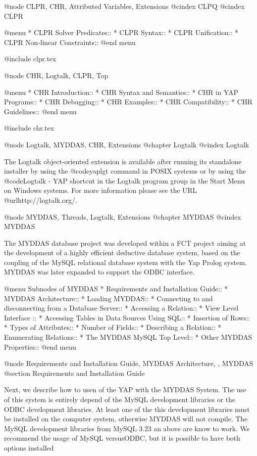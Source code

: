 {{{{{{{{{@node CLPR, CHR, Attributed Variables, Extensions
@cindex CLPQ
@cindex CLPR

@menu
* CLPR Solver Predicates::
* CLPR Syntax::
* CLPR Unification::
* CLPR Non-linear Constraints::               
@end menu

@include clpr.tex

@node CHR, Logtalk, CLPR, Top

@menu
* CHR Introduction::            
* CHR Syntax and Semantics::
* CHR in YAP Programs::
* CHR Debugging::               
* CHR Examples::       
* CHR Compatibility::     
* CHR Guidelines::  
@end menu

@include chr.tex

@node Logtalk, MYDDAS, CHR, Extensions
@chapter Logtalk
@cindex Logtalk

The Logtalk object-oriented extension is available after running its 
standalone installer by using the @code{yaplgt} command in POSIX 
systems or by using the @code{Logtalk - YAP} shortcut in the Logtalk 
program group in the Start Menu on Windows systems. For more information 
please see the URL @url{http://logtalk.org/}.

@node MYDDAS, Threads, Logtalk, Extensions
@chapter MYDDAS
@cindex MYDDAS

The MYDDAS database project was developed within a FCT project aiming at
the development of a highly efficient deductive database system, based
on the coupling of the MySQL relational database system with the Yap
Prolog system. MYDDAS was later expanded to support the ODBC interface.

@menu
Subnodes of MYDDAS
* Requirements and Installation Guide:: 
* MYDDAS Architecture:: 
* Loading MYDDAS:: 
* Connecting to and disconnecting from a Database Server:: 
* Accessing a Relation:: 
* View Level Interface :: 
* Accessing Tables in Data Sources Using SQL:: 
* Insertion of Rows:: 
* Types of Attributes:: 
* Number of Fields:: 
* Describing a Relation:: 
* Enumerating Relations:: 
* The MYDDAS MySQL Top Level:: 
* Other MYDDAS Properties:: 
@end menu

@node Requirements and Installation Guide, MYDDAS Architecture, , MYDDAS
@section Requirements and Installation Guide

Next, we describe how to usen of the YAP with the MYDDAS System.  The
use of this system is entirely depend of the MySQL development libraries
or the ODBC development libraries. At least one of the this development
libraries must be installed on the computer system, otherwise MYDDAS
will not compile. The MySQL development libraries from MySQL 3.23 an
above are know to work. We recommend the usage of MySQL versusODBC,
but it is possible to have both options installed

}}}}}}}}}
